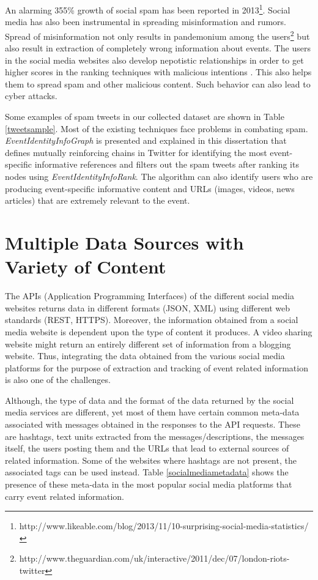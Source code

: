 An alarming 355\% growth of social spam has been reported in 2013\footnote{http://www.likeable.com/blog/2013/11/10-surprising-social-media-statistics/}. Social media has also been instrumental in spreading misinformation and rumors. Spread of misinformation not only results in pandemonium among the users\footnote{http://www.theguardian.com/uk/interactive/2011/dec/07/london-riots-twitter}  but also result in extraction of completely wrong information about events. The users in the social media websites also develop nepotistic relationships in order to get higher scores in the ranking techniques with malicious intentions \cite{gayo2013nepotistic}. This also helps them to spread spam and other malicious content. Such behavior can also lead to cyber attacks.

Some examples of spam tweets in our collected dataset are shown in Table \ref{tweetsample}. Most of the existing techniques face problems in combating spam.  \textit{EventIdentityInfoGraph} is presented and explained in this dissertation that defines mutually reinforcing chains in Twitter for identifying the most event-specific informative references and filters out the spam tweets after ranking its nodes using \textit{EventIdentityInfoRank}. The algorithm can also identify users who are producing event-specific informative content and URLs (images, videos, news articles) that are extremely relevant to the event. 

\section{Multiple Data Sources with Variety of Content}
The APIs (Application Programming Interfaces) of the different social media websites returns data in different formats (JSON, XML) using different web standards (REST, HTTPS). Moreover, the information obtained from a social media website is dependent upon the type of content it produces. A video sharing website might return an entirely different set of information from a blogging website. Thus, integrating the data obtained from the various social media platforms for the purpose of extraction and tracking of event related information is also one of the challenges.

Although, the type of data and the format of the data returned by the social media services are different, yet most of them have certain common meta-data associated with messages obtained in the responses to the API requests. These are hashtags, text units extracted from the messages/descriptions, the messages itself, the users posting them and the URLs that lead to external sources of related information. Some of the websites where hashtags are not present, the associated tags can be used instead. Table \ref{socialmediametadata} shows the presence of these meta-data in the most popular social media platforms that carry event related information.

